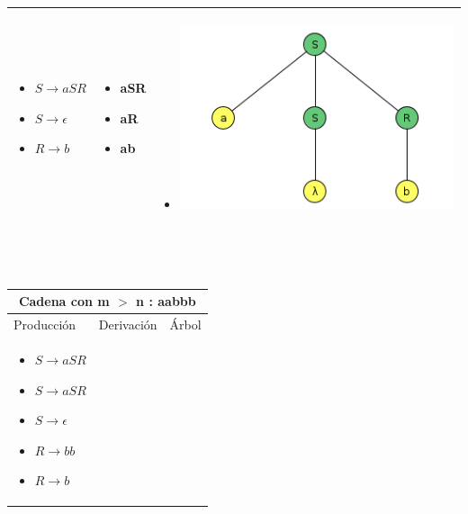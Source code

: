\documentclass{article}
\begin{document}
\begin{enumerate} [(a)]
\begin{tabular}{|p{3.5cm}|p{3.5cm}|p{8cm}|  }
\begin{itemize}[label={}]
             \item $ S \to aSR$ 
         \item $ S \to \epsilon$
         \item $ R \to b$	
         
         
        \end{itemize}
        &
        \begin{itemize}[label={}]
             
             \item	aSR 
         \item aR 
         \item ab 
         
        \end{itemize}
        &
         \begin{itemize}[label={}]
             \item \includegraphics[scale=0.40]{img/2e-ab.png}
        \end{itemize}
        \\ \hline
        \end{tabular}
        \\ \\
        \begin{tabular}{|p{3.5cm}|p{3.5cm}|p{8cm}|  }
         \hline
         \multicolumn{3}{|c|}{Cadena con m $>$ n : aabbb} \\
         \hline
         Producción & Derivación & Árbol\\
         \hline
         \begin{itemize}[label={}]
             
             \item $ S \to aSR$ 
         \item $ S \to aSR$ 
         \item $ S \to \epsilon$
         \item $ R \to bb$	
         \item $ R \to b$	
         

\end{itemize}
\end{tabular}
\end{enumerate}
\end{document}
